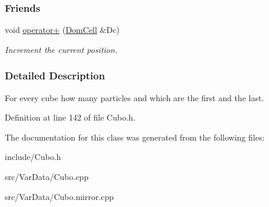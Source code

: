 \subsubsection*{Friends}
\begin{DoxyCompactItemize}
\item 
void \hyperlink{classDomCell_adc7011bf2c3bed47a9bc11e42b1eea74}{operator+} (\hyperlink{classDomCell}{Dom\+Cell} \&Dc)\hypertarget{classDomCell_adc7011bf2c3bed47a9bc11e42b1eea74}{}\label{classDomCell_adc7011bf2c3bed47a9bc11e42b1eea74}

\begin{DoxyCompactList}\small\item\em Increment the current position. \end{DoxyCompactList}\end{DoxyCompactItemize}


\subsubsection{Detailed Description}
For every cube how many particles and which are the first and the last. 

Definition at line 142 of file Cubo.\+h.



The documentation for this class was generated from the following files\+:\begin{DoxyCompactItemize}
\item 
include/Cubo.\+h\item 
src/\+Var\+Data/Cubo.\+cpp\item 
src/\+Var\+Data/Cubo.\+mirror.\+cpp\end{DoxyCompactItemize}
